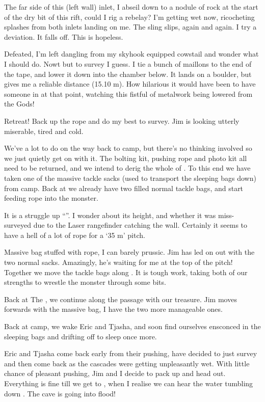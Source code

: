 The far side of this (left wall) inlet, I abseil down to a nodule of
rock at the start of the dry bit of this rift, could I rig a rebelay?
I'm getting wet now, ricocheting splashes from both inlets landing on
me. The sling slips, again and again. I try a deviation. It falls off.
This is hopeless.

Defeated, I'm left dangling from my skyhook equipped cowstail and wonder
what I should do. Nowt but to survey I guess. I tie a bunch of maillons
to the end of the tape, and lower it down into the chamber below. It
lands on a boulder, but gives me a reliable distance (15.10 m). How
hilarious it would have been to have someone in  at that
point, watching this fistful of metalwork being lowered from the Gods!

Retreat! Back up the rope and do my best to survey. Jim is looking
utterly miserable, tired and cold.

We've a lot to do on the way back to camp, but there's no thinking
involved so we just quietly get on with it. The bolting kit, pushing
rope and photo kit all need to be returned, and we intend to derig the
whole of . To this end we have taken one of the massive
tackle sacks (used to transport the sleeping bags down) from camp. Back
at  we already have two filled normal tackle bags, and
start feeding rope into the monster.

It is a struggle up ``''. I wonder about its height,
and whether it was miss-surveyed due to the Laser rangefinder catching
the wall. Certainly it seems to have a hell of a lot of rope for a `35
m' pitch.

Massive bag stuffed with rope, I can barely prussic. Jim has led on out
with the two normal sacks. Amazingly, he's waiting for me at the top of
the pitch! Together we move the tackle bags along . It
is tough work, taking both of our strengths to wrestle the monster
through some bits.

Back at The , we continue along the passage with our
treasure. Jim moves forwards with the massive bag, I have the two more
manageable ones.

Back at camp, we wake Eric and Tjasha, and soon find ourselves ensconced
in the sleeping bags and drifting off to sleep once more.

Eric and Tjasha come back early from their pushing, have decided to just
survey and then come back as the  cascades were
getting unpleasantly wet. With little chance of pleasant pushing, Jim
and I decide to pack up and head out. Everything is fine till we get to
, when I realise we can hear the water tumbling down . The cave is going into flood!

